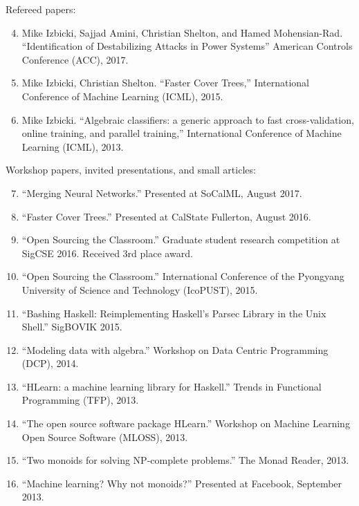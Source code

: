 \documentclass[12pt]{article}
\begin{document}
\noindent
Refereed papers:

\begin{enumerate}
\setcounter{enumi}{3}
\item
Mike Izbicki, Sajjad Amini, Christian Shelton, and Hamed Mohensian-Rad.
``Identification of Destabilizing Attacks in Power Systems''
American Controls Conference (ACC),
2017.

\item
Mike Izbicki, Christian Shelton.
``Faster Cover Trees,''
International Conference of Machine Learning (ICML),
2015.

\item
Mike Izbicki.
``Algebraic classifiers: a generic approach to fast cross-validation, online training, and parallel training,''
International Conference of Machine Learning (ICML),
2013.
\end{enumerate}

\noindent
Workshop papers, invited presentations, and small articles:

\begin{enumerate}
\setcounter{enumi}{6}
\item
``Merging Neural Networks.''  Presented at SoCalML, August 2017.

\item
``Faster Cover Trees.''  Presented at CalState Fullerton, August 2016.

\item
``Open Sourcing the Classroom.''  Graduate student research competition at SigCSE 2016.  Received 3rd place award.

\item
``Open Sourcing the Classroom.''  International Conference of the Pyongyang University of Science and Technology (IcoPUST), 2015.

\item
``Bashing Haskell: Reimplementing Haskell's Parsec Library in the Unix Shell.''
SigBOVIK 2015.

\item
``Modeling data with algebra.'' Workshop on Data Centric Programming (DCP), 2014.

\item
``HLearn: a machine learning library for Haskell.''
Trends in Functional Programming (TFP), 2013.

\item
``The open source software package HLearn.''
Workshop on Machine Learning Open Source Software (MLOSS), 2013.

\item
``Two monoids for solving NP-complete problems.''
The Monad Reader, 2013.

\item
``Machine learning? Why not monoids?''
Presented at Facebook, September 2013.
\end{enumerate}
\end{document}
